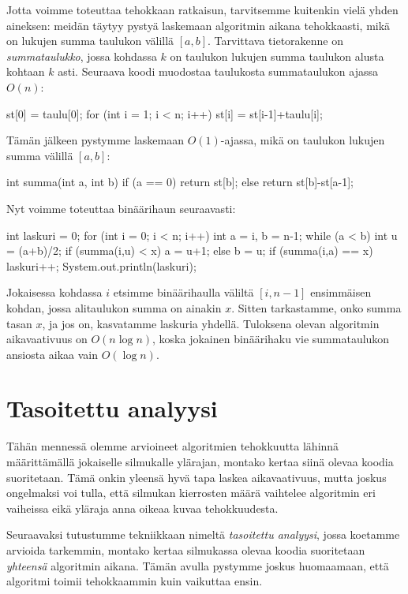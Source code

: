 Jotta voimme toteuttaa tehokkaan ratkaisun,
tarvitsemme kuitenkin vielä yhden aineksen:
meidän täytyy pystyä laskemaan algoritmin aikana tehokkaasti,
mikä on lukujen summa taulukon välillä $[a,b]$.
Tarvittava tietorakenne on \emph{summataulukko},
jossa kohdassa $k$ on taulukon
lukujen summa taulukon alusta kohtaan $k$ asti.
Seuraava koodi muodostaa taulukosta summataulukon ajassa $O(n)$:

\begin{code}
st[0] = taulu[0];
for (int i = 1; i < n; i++) {
    st[i] = st[i-1]+taulu[i];
}
\end{code}

Tämän jälkeen pystymme laskemaan $O(1)$-ajassa,
mikä on taulukon lukujen summa välillä $[a,b]$:

\begin{code}
int summa(int a, int b) {
    if (a == 0) return st[b];
    else return st[b]-st[a-1];
}
\end{code}

Nyt voimme toteuttaa binäärihaun seuraavasti:

\begin{code}
int laskuri = 0;
for (int i = 0; i < n; i++) {
    int a = i, b = n-1;
    while (a < b) {
        int u = (a+b)/2;
        if (summa(i,u) < x) a = u+1;
        else b = u;
    }
    if (summa(i,a) == x) laskuri++;
}
System.out.println(laskuri);
\end{code}

Jokaisessa kohdassa $i$ etsimme binäärihaulla väliltä $[i,n-1]$
ensimmäisen kohdan, jossa alitaulukon summa on ainakin $x$.
Sitten tarkastamme, onko summa tasan $x$,
ja jos on, kasvatamme laskuria yhdellä.
Tuloksena olevan algoritmin aikavaativuus on $O(n \log n)$,
koska jokainen binäärihaku vie summataulukon ansiosta
aikaa vain $O(\log n)$.

\section{Tasoitettu analyysi}

Tähän mennessä olemme arvioineet algoritmien tehokkuutta
lähinnä määrit\-tämällä jokaiselle silmukalle ylärajan,
montako kertaa siinä olevaa koodia suoritetaan.
Tämä onkin yleensä hyvä tapa laskea aikavaativuus,
mutta joskus ongelmaksi voi tulla, että silmukan kierrosten
määrä vaihtelee algoritmin eri vaiheissa eikä yläraja
anna oikeaa kuvaa tehokkuudesta.

Seuraavaksi tutustumme tekniikkaan nimeltä
\emph{tasoitettu analyysi}, jossa koetamme arvioida tarkemmin,
montako kertaa silmukassa olevaa koodia suoritetaan
\emph{yhteensä} algoritmin aikana.
Tämän avulla pystymme joskus huomaamaan, että algoritmi
toimii tehokkaammin kuin vaikuttaa ensin.

